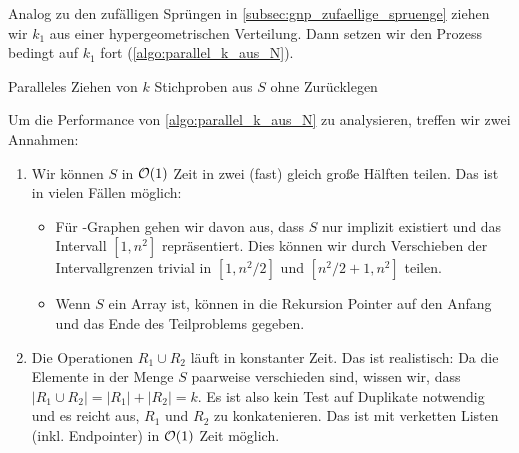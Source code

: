 Analog zu den zufälligen Sprüngen in \cref{subsec:gnp_zufaellige_spruenge} ziehen wir $k_1$ aus einer hypergeometrischen Verteilung.
Dann setzen wir den Prozess bedingt auf $k_1$ fort (\cref{algo:parallel_k_aus_N}).

\begin{algorithm}
    \caption{Paralleles Ziehen von $k$ Stichproben aus $S$ ohne Zurücklegen}
    \label{algo:parallel_k_aus_N}
\end{algorithm}

\goodbreak

\noindent
Um die Performance von \cref{algo:parallel_k_aus_N} zu analysieren, treffen wir zwei Annahmen:
\begin{enumerate}
    \item Wir können $S$ in $\mathcal{O}\!\left(1\right)$ Zeit in zwei (fast) gleich große Hälften teilen.
          Das ist in vielen Fällen möglich:
          \begin{itemize}
              \item Für \Gnm-Graphen gehen wir davon aus, dass $S$ nur implizit existiert und das Intervall $[1, n^2]$ repräsentiert.
                    Dies können wir durch Verschieben der Intervallgrenzen trivial in $[1, n^2 / 2]$ und $[n^2/2 + 1, n^2]$ teilen.
              \item Wenn $S$ ein Array ist, können in die Rekursion Pointer auf den Anfang und das Ende des Teilproblems gegeben.
          \end{itemize}

    \item Die Operationen $R_1 \cup R_2$ läuft in konstanter Zeit.
          Das ist realistisch: Da die Elemente in der Menge $S$ paarweise verschieden sind, wissen wir, dass $|R_1 \cup R_2| = |R_1| + |R_2| = k$.
          Es ist also kein Test auf Duplikate \oA notwendig und es reicht aus, $R_1$ und $R_2$ zu konkatenieren.
          Das ist mit verketten Listen (inkl. Endpointer) in $\mathcal{O}\!\left(1\right)$ Zeit möglich.
\end{enumerate}

